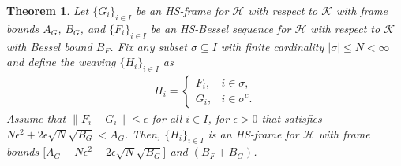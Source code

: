 \documentclass[10pt,a4paper]{amsart}
\newtheorem{thm}{Theorem}
\begin{document}
\begin{thm}\label{thm2}
Let  $\{G_i\}_{i \in I}$ be an HS-frame for $\mathcal{H}$ with respect to $\mathcal{K}$ with frame bounds $A_G$, $B_G$, and $\{F_i\}_{i \in I}$ be an HS-Bessel sequence for
$\mathcal{H}$ with respect to $\mathcal{K}$ with Bessel bound $B_F$. Fix any subset $\sigma \subseteq I$ with finite cardinality $|\sigma| \leq N < \infty$ and define the weaving  $\{H_i\}_{i \in I}$ as
\begin{align*}
H_i = \begin{cases}
F_i, & i \in \sigma, \\
G_i, & i \in \sigma^c.
\end{cases}
\end{align*}
Assume that  $\|F_i - G_i\| \leq \epsilon$ for all $i \in I$, for $\epsilon>0$ that satisfies $N\epsilon^2 +2\epsilon\sqrt{N} \sqrt{B_G}<A_G$.
Then,  $\{H_i\}_{i \in I}$ is an HS-frame for $\mathcal{H}$ with frame bounds $\big[A_G-N\epsilon^2 -2\epsilon\sqrt{N} \sqrt{B_G}\big]$ and $(B_F + B_G)$.
\end{thm}
\end{document}
